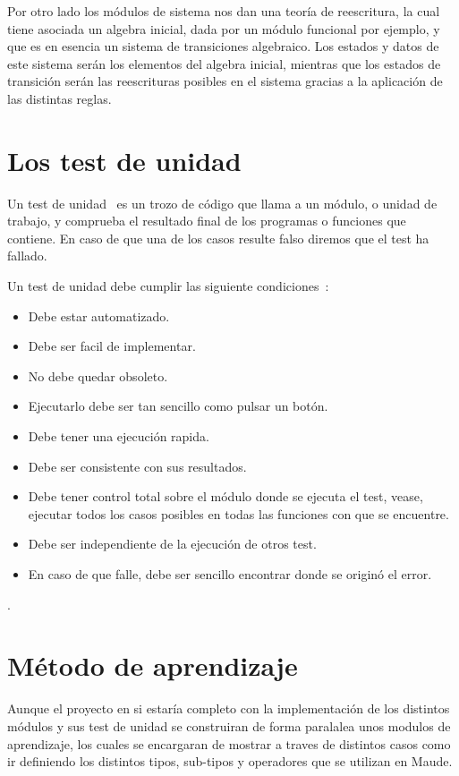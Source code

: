 Por otro lado los módulos de sistema nos dan una teoría de reescritura, la cual tiene asociada un algebra inicial, dada por un módulo funcional por ejemplo, y que es en esencia un sistema de transiciones algebraico. Los estados y datos de este sistema serán los elementos del algebra inicial, mientras que los estados de transición serán las reescrituras posibles en el sistema gracias a la aplicación de las distintas reglas.\par


\section{Los test de unidad}

Un test de unidad~\cite{unitTests} es un trozo de código que llama a un módulo, o unidad de trabajo, y comprueba el resultado final de los programas o funciones que contiene. En caso de que una de los casos resulte falso diremos que el test ha fallado.\par

Un test de unidad debe cumplir las siguiente condiciones~\cite{unitTests}: \par

\begin{itemize}
\item Debe estar automatizado.
\item Debe ser facil de implementar.
\item No debe quedar obsoleto.
\item Ejecutarlo debe ser tan sencillo como pulsar un botón.
\item Debe tener una ejecución rapida.
\item Debe ser consistente con sus resultados. 
\item Debe tener control total sobre el módulo donde se ejecuta el test, vease, ejecutar todos los casos posibles en todas las funciones con que se encuentre.
\item Debe ser independiente de la ejecución de otros test.
\item En caso de que falle, debe ser sencillo encontrar donde se originó el error.
\end{itemize}.




\section{Método de aprendizaje}

Aunque el proyecto en si estaría completo con la implementación de los distintos módulos y sus test de unidad se construiran de forma paralalea unos modulos de aprendizaje, los cuales se encargaran de mostrar a traves de distintos casos como ir definiendo los distintos tipos, sub-tipos y operadores que se utilizan en Maude.\par

